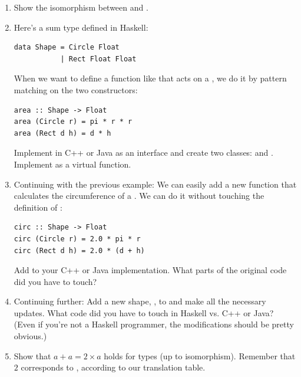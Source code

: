 \begin{enumerate}
\tightlist
\item
  Show the isomorphism between  and
  .
\item
  Here's a sum type defined in Haskell:

\begin{Verbatim}
data Shape = Circle Float 
           | Rect Float Float
\end{Verbatim}
  When we want to define a function like  that acts on a
  , we do it by pattern matching on the two constructors:

\begin{Verbatim}
area :: Shape -> Float
area (Circle r) = pi * r * r
area (Rect d h) = d * h
\end{Verbatim}
  Implement  in C++ or Java as an interface and create two
  classes:  and . Implement  as
  a virtual function.
\item
  Continuing with the previous example: We can easily add a new function
   that calculates the circumference of a .
  We can do it without touching the definition of :

\begin{Verbatim}
circ :: Shape -> Float
circ (Circle r) = 2.0 * pi * r
circ (Rect d h) = 2.0 * (d + h)
\end{Verbatim}
  Add  to your C++ or Java implementation. What parts of
  the original code did you have to touch?
\item
  Continuing further: Add a new shape, , to
   and make all the necessary updates. What code did you
  have to touch in Haskell vs. C++ or Java? (Even if you're not a
  Haskell programmer, the modifications should be pretty obvious.)
\item
  Show that $a + a = 2 \times a$ holds for types (up to
  isomorphism). Remember that $2$ corresponds to ,
  according to our translation table.
\end{enumerate}